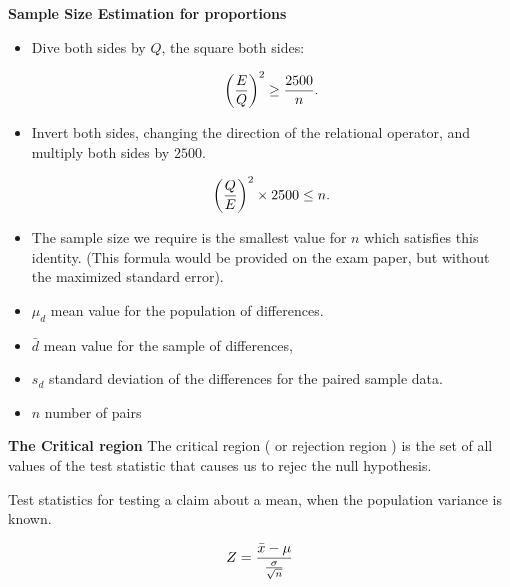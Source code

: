 \textbf{Sample Size Estimation for proportions}

\begin{itemize}

\item Dive both sides by $Q$, the square both sides:

\[ \left({E\over Q}\right)^2 \geq {2500 \over n}. \]

\item Invert both sides, changing the direction of the relational operator, and multiply both sides by $2500$.

\[ \left({Q\over E}\right)^2 \times 2500 \leq n. \]

\item The sample size we require is the smallest value for $n$ which satisfies this identity. (This formula would be provided on the exam paper, but without the maximized standard error).
\end{itemize}




{
\begin{itemize}
\item $\mu_d$ mean value for the population of differences.
\item $\bar{d}$ mean value for the sample of differences,
\item $s_d$ standard deviation of the differences for the paired sample data.
\item $n$ number of pairs
\end{itemize}


}




{
\textbf{The Critical region}
The critical region ( or rejection region ) is the set of all values of the test statistic that causes us to rejec the null hypothesis.

}
{

Test statistics for testing a claim about a mean, when the population variance is known.

\[ Z = {\bar{x}  - \mu \over {\sigma \over \sqrt{n}}} \]
}






